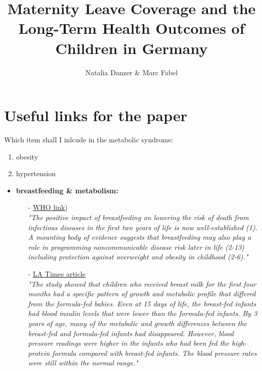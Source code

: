 \documentclass{scrartcl} %
\author{Natalia Danzer \& Marc Fabel}
\title{Maternity Leave Coverage and the Long-Term Health Outcomes of Children in Germany}
\begin{document}
\maketitle
\tableofcontents
\newpage



\section{Useful links for the paper}

Which item shall I inlcude in the metabolic syndrome: 
\begin{enumerate}
\item obesity
\item hypertension
\end{enumerate}

\begin{itemize}
\item \textbf{breastfeeding \& metabolism:}

\begin{itemize}
\item[-]\href{http://www.who.int/elena/titles/bbc/breastfeeding_childhood_obesity/en/}{WHO link})\\ 
\textit{"The positive impact of breastfeeding on lowering the risk of death from infectious diseases in the first two years of life is now well-established (1). A mounting body of evidence suggests that breastfeeding may also play a role in programming noncommunicable disease risk later in life (2-13) including protection against overweight and obesity in childhood (2-6)."}

\item[-]\href{http://articles.latimes.com/2011/may/02/news/la-heb-infant-feeding-20110502}{LA Times article}\\
\textit{"The study showed that children who received breast milk for the first four months had a specific pattern of growth and metabolic profile that differed from the formula-fed babies. Even at 15 days of life, the breast-fed infants had blood insulin levels that were lower than the formula-fed infants.\newline
By 3 years of age, many of the metabolic and growth differences between the breast-fed and formula-fed infants had disappeared. However, blood pressure readings were higher in the infants who had been fed the high-protein formula compared with breast-fed infants. The blood pressure rates were still within the normal range."}
\end{itemize}
\end{itemize}
\end{document}
